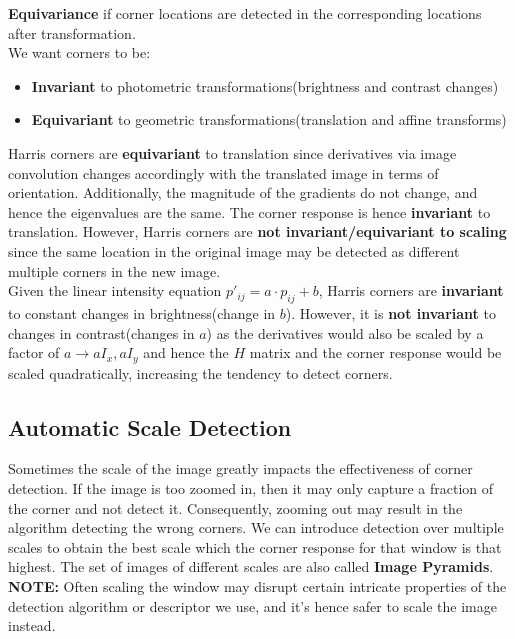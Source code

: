\documentclass[12pt]{article}
\begin{document}
\textbf{Equivariance} if corner locations are detected in the corresponding locations after transformation.\\

We want corners to be:\\

\begin{itemize}
\item \textbf{Invariant} to photometric transformations(brightness and contrast changes)
\item \textbf{Equivariant} to geometric transformations(translation and affine transforms)
\end{itemize}

Harris corners are \textbf{equivariant} to translation since derivatives via image convolution changes accordingly with the translated image in terms of orientation. Additionally, the magnitude of the gradients do not change, and hence the eigenvalues are the same. The corner response is hence \textbf{invariant} to translation.  However, Harris corners are \textbf{not invariant/equivariant to scaling} since the same location in the original image may be detected as different multiple corners in the new image.\\

Given the linear intensity equation $p'_{ij} = a \cdot p_{ij} + b$, Harris corners are \textbf{invariant} to constant changes in brightness(change in $b$). However, it is \textbf{not invariant} to changes in contrast(changes in $a$) as the derivatives would also be scaled by a factor of $a \rightarrow aI_x, aI_y$ and hence the $H$ matrix and the corner response would be scaled quadratically, increasing the tendency to detect corners.

\subsection{Automatic Scale Detection}

Sometimes the scale of the image greatly impacts the effectiveness of corner detection. If the image is too zoomed in, then it may only capture a fraction of the corner and not detect it. Consequently, zooming out may result in the algorithm detecting the wrong corners. We can introduce detection over multiple scales to obtain the best scale which the corner response for that window is that highest. The set of images of different scales are also called \textbf{Image Pyramids}.\\

\textbf{NOTE:} Often scaling the window may disrupt certain intricate properties of the detection algorithm or descriptor we use, and it's hence safer to scale the image instead.\\
\end{document}
